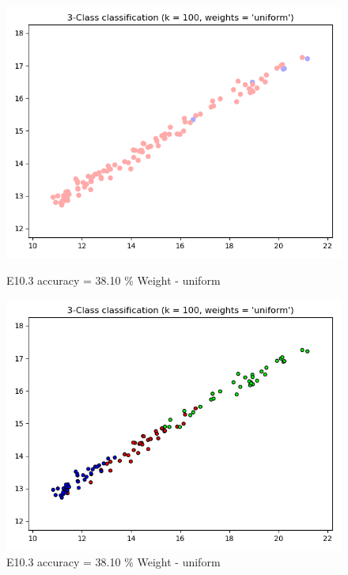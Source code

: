 \documentclass{classrep}
\begin{document}
\begin{figure}[H]
\begin{minipage}{0.5\linewidth}
				\includegraphics[scale=0.25]{KNN_seed_10_9.png}
				\caption{E10.3 accuracy = 38.10 \% Weight - uniform}
				\label{E10.3}
			\end{minipage}
			\begin{minipage}{0.5\linewidth}
				\centering
				\includegraphics[scale=0.25]{KNN_seed_10_10.png}
				\caption{E10.3 accuracy = 38.10 \% Weight - uniform}
				\label{E10.3}
			\end{minipage}
			\begin{minipage}{0.5\linewidth}
				\centering

\end{minipage}
\end{figure}
\end{document}
